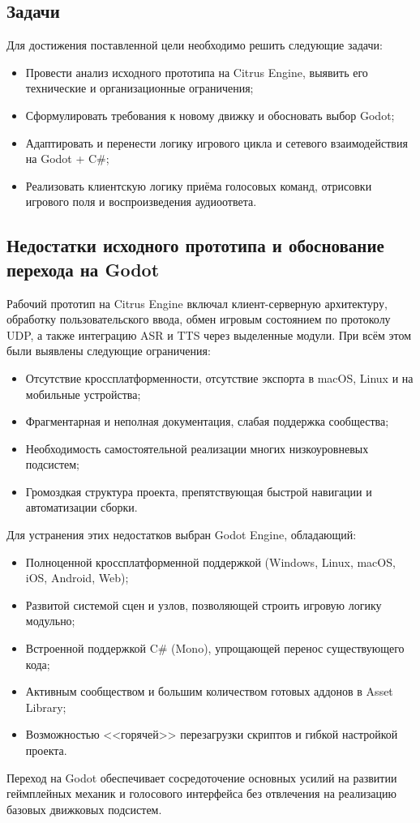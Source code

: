     \subsection{Задачи}
    Для достижения поставленной цели необходимо решить следующие задачи:
    \begin{itemize}
    \item Провести анализ исходного прототипа на Citrus Engine, выявить его технические и организационные ограничения;
    \item Сформулировать требования к новому движку и обосновать выбор Godot;
    \item Адаптировать и перенести логику игрового цикла и сетевого взаимодействия на Godot + C\#;
    \item Реализовать клиентскую логику приёма голосовых команд, отрисовки игрового поля и воспроизведения аудиоответа.
    \end{itemize}

    \subsection{Недостатки исходного прототипа и обоснование перехода на Godot}
    Рабочий прототип на Citrus Engine включал клиент-серверную архитектуру, обработку пользовательского ввода, обмен игровым состоянием по протоколу UDP, а также интеграцию ASR и TTS через выделенные модули. При всём этом были выявлены следующие ограничения:
    \begin{itemize}
    \item Отсутствие кроссплатформенности, отсутствие экспорта в macOS, Linux и на мобильные устройства;
    \item Фрагментарная и неполная документация, слабая поддержка сообщества;
    \item Необходимость самостоятельной реализации многих низкоуровневых подсистем;
    \item Громоздкая структура проекта, препятствующая быстрой навигации и автоматизации сборки.
    \end{itemize}

    Для устранения этих недостатков выбран Godot Engine, обладающий:
    \begin{itemize}
    \item Полноценной кроссплатформенной поддержкой (Windows, Linux, macOS, iOS, Android, Web);
    \item Развитой системой сцен и узлов, позволяющей строить игровую логику модульно;
    \item Встроенной поддержкой C\# (Mono), упрощающей перенос существующего кода;
    \item Активным сообществом и большим количеством готовых аддонов в Asset Library;
    \item Возможностью <<горячей>> перезагрузки скриптов и гибкой настройкой проекта.
    \end{itemize}

    Переход на Godot обеспечивает сосредоточение основных усилий на развитии геймплейных механик и голосового интерфейса без отвлечения на реализацию базовых движковых подсистем.